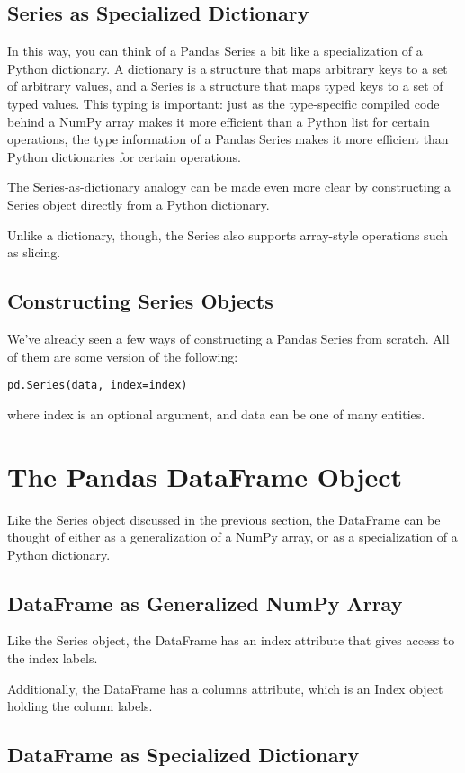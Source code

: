 \subsection*{Series as Specialized Dictionary}
In this way, you can think of a Pandas Series a bit like a specialization of a Python
dictionary. A dictionary is a structure that maps arbitrary keys to a set of arbitrary
values, and a Series is a structure that maps typed keys to a set of typed values. This
typing is important: just as the type-specific compiled code behind a NumPy array
makes it more efficient than a Python list for certain operations, the type information
of a Pandas Series makes it more efficient than Python dictionaries for certain
operations.

The Series-as-dictionary analogy can be made even more clear by constructing a
Series object directly from a Python dictionary.

Unlike a dictionary, though, the Series also supports array-style operations such as
slicing.

\subsection*{Constructing Series Objects}
We've already seen a few ways of constructing a Pandas Series from scratch. All of
them are some version of the following:

\verb|pd.Series(data, index=index)|

where index is an optional argument, and data can be one of many entities.

\section{The Pandas DataFrame Object}
Like the Series object
discussed in the previous section, the DataFrame can be thought of either as a generalization of a NumPy array, or as a specialization of a Python dictionary.

\subsection*{DataFrame as Generalized NumPy Array}

Like the Series object, the DataFrame has an index attribute that gives access to the
index labels.

Additionally, the DataFrame has a columns attribute, which is an Index object holding
the column labels.

\subsection*{DataFrame as Specialized Dictionary}

